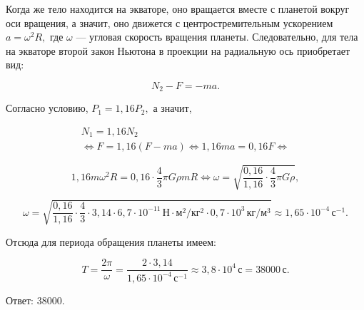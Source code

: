 \documentclass[12pt,a4paper]{article}
\begin{document}
{Когда же тело находится на экваторе, оно вращается вместе с планетой вокруг оси вращения, а значит, оно движется с центростремительным ускорением $a=\omega ^2 R,$ где $\omega$ — угловая скорость вращения планеты. Следовательно, для тела на экваторе второй закон Ньютона в проекции на радиальную ось приобретает вид: 

\[N_2 - F= - ma.\]

Согласно условию, $P_1=1{,}16P_2,$ а значит,

\[\begin{gathered}N_1=1{,}16N_2 \\\Longleftrightarrow  F=1{,}16 ( F - ma ) \Longleftrightarrow  1{,}16ma=0{,}16F \Longleftrightarrow \end{gathered}\]

\[1{,}16m\omega^2R=0{,}16\cdot\frac43\pi G\rho mR\Longleftrightarrow\omega=\sqrt{\frac{0{,}16}{1{,}16}\cdot\frac43\pi G\rho},\]

\[\omega=\sqrt{\frac{0{,}16}{1{,}16}\cdot\frac43\cdot3{,}14\cdot6{,}7\cdot10^{-11}\,\text{Н}\cdot\text{м}^2/\text{кг}^2\cdot0{,}7\cdot10^3\,\text{кг}/\text{м}^3}\approx1{,}65\cdot10^{-4}\,\text{с}^{-1}.\]

Отсюда для периода обращения планеты имеем:

\[T=\frac{2\pi}{\omega}=\frac{2\cdot3{,}14}{1{,}65\cdot10^{-4}\,\text{с}^{-1}}\approx3{,}8\cdot10^4\,\text{с}=38000\,\text{с}.\]

Ответ: $38000$.
}
\end{document}
